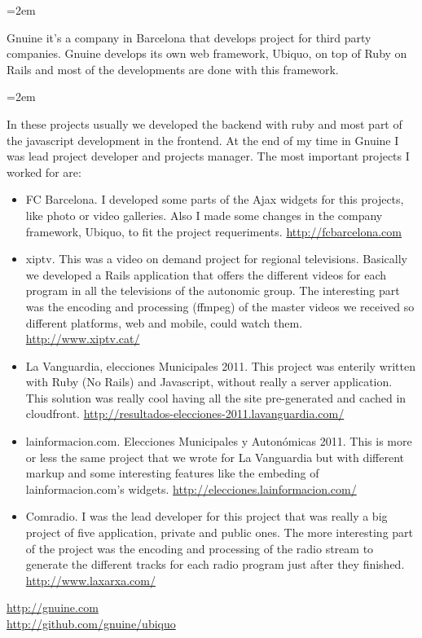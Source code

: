 \documentclass{scrartcl}
\newcommand{\MarginText}[1]{\marginpar{\raggedleft\itshape\small#1}} %
\newcommand{\Description}[1]{\hangindent=2em\hangafter=0\noindent\raggedright\footnotesize{#1}\par\normalsize\vspace{1em}} %
\begin{document}
\begin{cv}{}
\Description{\MarginText{Gnuine}Gnuine it's a company in Barcelona that develops
    project for third party companies. Gnuine
    develops its own web framework, Ubiquo, on top of Ruby on Rails and most of
    the developments are done with this framework.}
\Description{
    In these projects usually we developed the backend with ruby and
    most part of the javascript development in the frontend. At the
    end of my time in Gnuine I was lead project developer and projects manager.
    The most important projects I worked for are:
    \begin{itemize}
    \item FC Barcelona. I developed some parts of the Ajax widgets for
      this projects, like photo or video galleries. Also I made some
      changes in the company framework, Ubiquo, to fit the project
      requeriments. \href{http://fcbarcelona.com}{http://fcbarcelona.com}
    \item xiptv. This was a video on demand project for regional
      televisions. Basically we developed a Rails application that
      offers the different videos for each program in all the
      televisions of the autonomic group.
      The interesting part was the encoding and processing (ffmpeg) of the
      master videos we received so different platforms, web and
      mobile, could watch them. \href{http://www.xiptv.cat/}{http://www.xiptv.cat/}
    \item La Vanguardia, elecciones Municipales 2011. This project was
      enterily written with Ruby (No Rails) and Javascript, without really a
      server application. This solution was really cool having all the
      site pre-generated and cached in cloudfront. \href{http://resultados-elecciones-2011.lavanguardia.com/}{http://resultados-elecciones-2011.lavanguardia.com/}
    \item lainformacion.com. Elecciones Municipales y Autonómicas
      2011. This is more or less the same project that we wrote for
      La Vanguardia but with different markup and some interesting
      features like the embeding of lainformacion.com's widgets. \href{http://elecciones.lainformacion.com/}{http://elecciones.lainformacion.com/}
    \item Comradio. I was the lead developer for this project that was
      really a big project of five application, private and public ones.
      The more interesting part of the project was the encoding and
      processing of the radio stream to generate the different tracks
      for each radio program just after they finished. \href{http://www.laxarxa.com/}{http://www.laxarxa.com/}
    \end{itemize}
    \href{http://gnuine.com}{http://gnuine.com}
    \\\href{http://github.com/gnuine/ubiquo}{http://github.com/gnuine/ubiquo}}


\end{cv}
\end{document}
